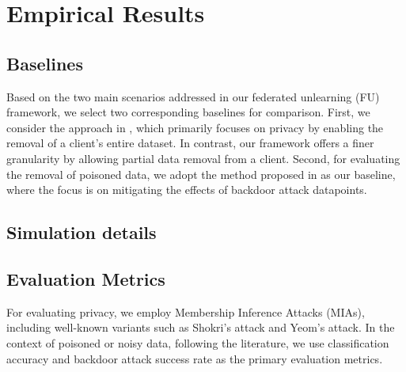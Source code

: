 \documentclass{article}
\begin{document}
\newpage
\appendix

\section{Empirical Results}
\subsection{Baselines}
Based on the two main scenarios addressed in our federated unlearning (FU) framework, we select two corresponding baselines for comparison.
First, we consider the approach in \cite{halimi2023federatedunlearningefficientlyerase}, which primarily focuses on privacy by enabling the removal of a client’s entire dataset. In contrast, our framework offers a finer granularity by allowing partial data removal from a client.
Second, for evaluating the removal of poisoned data, we adopt the method proposed in \cite{wang2024goldfishefficientfederatedunlearning} as our baseline, where the focus is on mitigating the effects of backdoor attack datapoints.
\subsection{Simulation details}
\subsection{Evaluation Metrics}
For evaluating privacy, we employ Membership Inference Attacks (MIAs), including well-known variants such as Shokri’s attack \cite{shokri2017membershipinferenceattacksmachine} and Yeom’s attack\cite{yeom2018privacyriskmachinelearning}.
In the context of poisoned or noisy data, following the literature, we use classification accuracy and backdoor attack success rate as the primary evaluation metrics.
\end{document}
